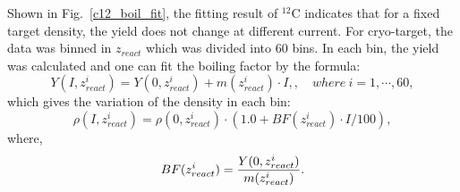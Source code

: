  Shown in Fig.~\ref{c12_boil_fit}, the fitting result of $\mathrm{^{12}C}$ indicates that for a fixed target density, the yield does not change at different current. For cryo-target, the data was binned in $z_{react}$ which was divided into 60 bins. In each bin, the yield was calculated and one can fit the boiling factor by the formula:
 \begin{equation}
  Y(I, z_{react}^{i}) = Y(0, z_{react}^{i}) + m(z_{react}^{i})\cdot I,,\quad where~i=1,\cdots,60,
  \label{eq_yield_rho_zbin}
\end{equation}
which gives the variation of the density in each bin:
 \begin{equation}
  \rho(I, z_{react}^{i}) = \rho(0, z_{react}^{i}) \cdot (1.0 + BF(z_{react}^{i}) \cdot I /100),
  \label{eq_rho_zbin}
 \end{equation}
where,
 \begin{equation}
   BF(z_{react}^{i})=\frac{Y(0, z_{react}^{i})}{m(z_{react}^{i})}. \\
     \label{eq_bf_zbin}
 \end{equation}

